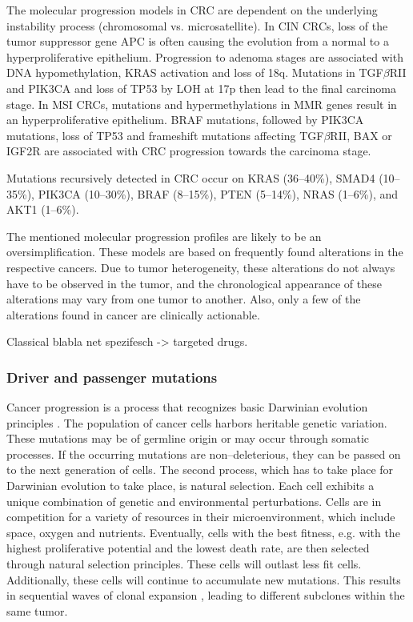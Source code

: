     The molecular progression models in CRC are dependent on the underlying
    instability process (chromosomal vs. microsatellite). In CIN CRCs, loss of
    the tumor suppressor gene APC is often causing the evolution from a normal
    to a hyperproliferative epithelium. Progression to adenoma stages are
    associated with DNA hypomethylation, KRAS activation and loss of 18q.
    Mutations in TGF$\beta$RII and PIK3CA and loss of TP53 by LOH at 17p then
    lead to the final carcinoma stage. In MSI CRCs, mutations and
    hypermethylations in MMR genes result in an hyperproliferative epithelium.
    BRAF mutations, followed by PIK3CA mutations, loss of TP53 and frameshift
    mutations affecting TGF$\beta$RII, BAX or IGF2R are associated with CRC
    progression towards the carcinoma stage.

    Mutations recursively detected in CRC occur on KRAS (36--40\%), SMAD4
    (10--35\%), PIK3CA (10--30\%), BRAF (8--15\%), PTEN (5--14\%), NRAS
    (1--6\%), and  AKT1 (1--6\%).

    The mentioned molecular progression profiles are likely to be an
    oversimplification. These models are based on frequently found alterations
    in the respective cancers. Due to tumor heterogeneity, these alterations do
    not always have to be observed in the tumor, and the chronological
    appearance of these alterations may vary from one tumor to another. Also,
    only a few of the alterations found in cancer are clinically actionable.

    Classical blabla net spezifesch -> targeted drugs.



    \subsubsection{Driver and passenger mutations}

      Cancer progression is a process that recognizes basic Darwinian evolution
      principles {\cite{clonal_evolution}} {\cite{darwinian_models}}
      {\cite{war_zone}} {\cite{cancer_models}}. The population of cancer cells
      harbors heritable genetic variation. These mutations may be of germline
      origin or may occur through somatic processes. If the occurring mutations
      are non--deleterious, they can be passed on to the next generation of cells.
      The second process, which has to take place for Darwinian evolution to take
      place, is natural selection. Each cell exhibits a unique combination of
      genetic and environmental perturbations. Cells are in competition for a
      variety of resources in their microenvironment, which include space, oxygen
      and nutrients. Eventually, cells with the best fitness, e.g. with the
      highest proliferative potential and the lowest death rate, are then selected
      through natural selection principles. These cells will outlast less fit
      cells. Additionally, these cells will continue to accumulate new mutations.
      This results in sequential waves of clonal expansion
      {\cite{clonal_evolution}}, leading to different subclones within the same
      tumor.

